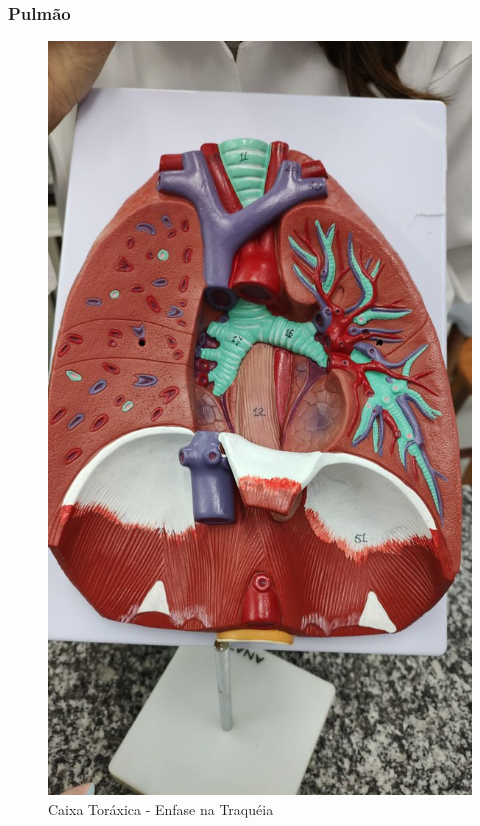 \documentclass[
]{book}
\begin{document}
\hypertarget{pulmuxe3o}{%
\subsubsection{Pulmão}\label{pulmuxe3o}}

\begin{figure}

{\centering \includegraphics[width=0.9\linewidth]{figuras/Aula8-3-caixa-toracica-enfase-traqueia} 

}

\caption{Caixa Toráxica - Enfase na Traquéia}\label{fig:unnamed-chunk-19}
\end{figure}
\end{document}
